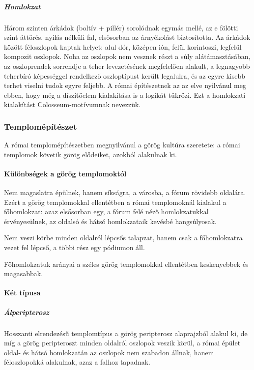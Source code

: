 	\subparagraph{Homlokzat}
	Három szinten árkádok (boltív + pillér) sorolódnak egymás mellé, az e fölötti szint áttörés, nyílás nélküli fal, elsősorban az árnyékolást biztosította. Az árkádok között féloszlopok kaptak helyet: alul dór, középen ión, felül korintoszi, legfelül kompozit oszlopok. Noha az oszlopok nem vesznek részt a súly alátámasztásában, az oszloprendek sorrendje a teher levezetésének megfelelően alakult, a legnagyobb teherbíró képességgel rendelkező oszloptípust került legalulra, és az egyre kisebb terhet viselni tudok egyre feljebb. A római építészetnek az az elve nyilvánul meg ebben, hogy még a díszítőelem kialakítása is a logikát tükrözi. Ezt a homlokzati kialakítást Colosseum-motívumnak nevezzük.

\subsubsection{Templomépítészet}

A római templomépítészetben megnyilvánul a görög kultúra szeretete: a római templomok követik görög elődeiket, azokból alakulnak ki.

\paragraph{Különbségek a görög templomoktól}
\begin{compactitem}
	\item Nem magaslatra épülnek, hanem síkságra, a városba, a fórum rövidebb oldalára. Ezért a görög templomokkal ellentétben a római templomoknál kialakul a főhomlokzat: azaz elsősorban egy, a fórum felé néző homlokzatukkal érvényesülnek, az oldalsó és hátsó homlokzataik kevésbé hangsúlyosak.
	
	\item Nem veszi körbe minden oldalról lépcsős talapzat, hanem csak a főhomlokzatra vezet fel lépcső, a többi rész egy pódiumon áll.
	
	\item Főhomlokzatuk arányai a széles görög templomokkal ellentétben keskenyebbek és magasabbak.
\end{compactitem}

\paragraph{Két típusa}

	\subparagraph{Álperipterosz}
	Hosszanti elrendezésű templomtípus a görög peripterosz alaprajzból alakul ki, de míg a görög peripteroszt minden oldalról oszlopok veszik körül, a római épület oldal- és hátsó homlokzatán az oszlopok nem szabadon állnak, hanem féloszlopokká alakulnak, azaz a falhoz tapadnak.
	
